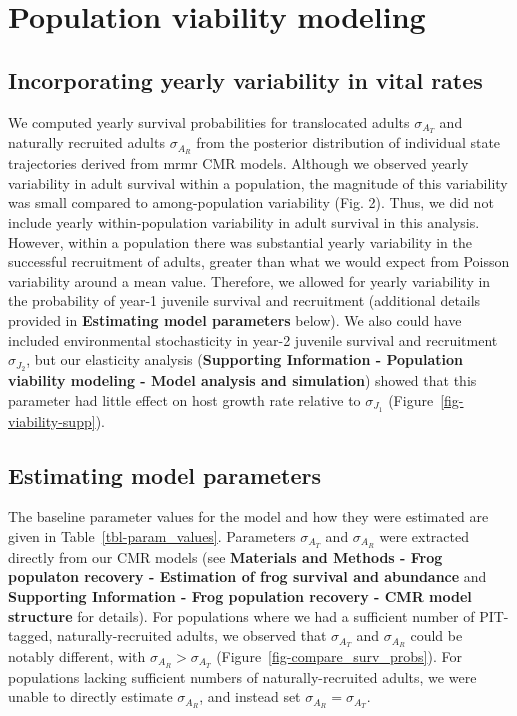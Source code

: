 \documentclass[9pt,twoside,lineno]{pnas-new-SI}
\begin{document}
\hypertarget{population-viability-modeling-1}{%
\section{Population viability
modeling}\label{population-viability-modeling-1}}

\hypertarget{incorporating-yearly-variability-in-vital-rates}{%
\subsection{Incorporating yearly variability in vital
rates}\label{incorporating-yearly-variability-in-vital-rates}}

We computed yearly survival probabilities for translocated adults
\(\sigma_{A_T}\) and naturally recruited adults \(\sigma_{A_R}\) from
the posterior distribution of individual state trajectories derived from
mrmr CMR models. Although we observed yearly variability in adult
survival within a population, the magnitude of this variability was
small compared to among-population variability
(Fig. 2). Thus, we did not include
yearly within-population variability in adult survival in this analysis.
However, within a population there was substantial yearly variability in
the successful recruitment of adults, greater than what we would expect
from Poisson variability around a mean value. Therefore, we allowed for
yearly variability in the probability of year-1 juvenile survival and
recruitment (additional details provided in \textbf{Estimating model
parameters} below). We also could have included environmental
stochasticity in year-2 juvenile survival and recruitment
\(\sigma_{J_2}\), but our elasticity analysis (\textbf{Supporting
Information - Population viability modeling - Model analysis and
simulation}) showed that this parameter had little effect on host growth
rate relative to \(\sigma_{J_1}\) (Figure~\ref{fig-viability-supp}).

\hypertarget{estimating-model-parameters}{%
\subsection{Estimating model
parameters}\label{estimating-model-parameters}}

The baseline parameter values for the model and how they were estimated
are given in Table~\ref{tbl-param_values}. Parameters \(\sigma_{A_T}\)
and \(\sigma_{A_R}\) were extracted directly from our CMR models (see
\textbf{Materials and Methods - Frog populaton recovery - Estimation of
frog survival and abundance} and \textbf{Supporting Information - Frog
population recovery - CMR model structure} for details). For populations
where we had a sufficient number of PIT-tagged, naturally-recruited
adults, we observed that \(\sigma_{A_T}\) and \(\sigma_{A_R}\) could be
notably different, with \(\sigma_{A_R} > \sigma_{A_T}\)
(Figure~\ref{fig-compare_surv_probs}). For populations lacking
sufficient numbers of naturally-recruited adults, we were unable to
directly estimate \(\sigma_{A_R}\), and instead set
\(\sigma_{A_R} = \sigma_{A_T}\).
\end{document}
